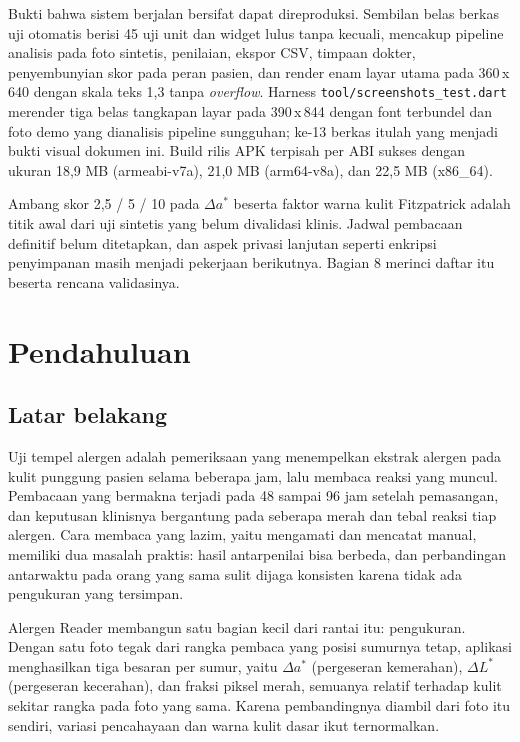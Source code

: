 \documentclass[11pt,a4paper]{article}
\begin{document}
Bukti bahwa sistem berjalan bersifat dapat direproduksi. Sembilan belas berkas
uji otomatis berisi 45 uji unit dan widget lulus tanpa kecuali, mencakup pipeline
analisis pada foto sintetis, penilaian, ekspor CSV, timpaan dokter, penyembunyian
skor pada peran pasien, dan render enam layar utama pada 360\,x\,640 dengan skala
teks 1,3 tanpa \textit{overflow}. Harness \texttt{tool/screenshots\_test.dart}
merender tiga belas tangkapan layar pada 390\,x\,844 dengan font terbundel dan
foto demo yang dianalisis pipeline sungguhan; ke-13 berkas itulah yang menjadi
bukti visual dokumen ini. Build rilis APK terpisah per ABI sukses dengan ukuran
18,9 MB (armeabi-v7a), 21,0 MB (arm64-v8a), dan 22,5 MB (x86\_64).

\begin{catatan}
Ambang skor 2,5 / 5 / 10 pada $\Delta a^*$ beserta faktor warna kulit Fitzpatrick adalah titik awal dari uji sintetis yang belum divalidasi klinis. Jadwal pembacaan definitif belum ditetapkan, dan aspek privasi lanjutan seperti enkripsi penyimpanan masih menjadi pekerjaan berikutnya. Bagian 8 merinci daftar itu beserta rencana validasinya.
\end{catatan}

\section{Pendahuluan}

\subsection{Latar belakang}

Uji tempel alergen adalah pemeriksaan yang menempelkan ekstrak alergen pada kulit
punggung pasien selama beberapa jam, lalu membaca reaksi yang muncul. Pembacaan
yang bermakna terjadi pada 48 sampai 96 jam setelah pemasangan, dan keputusan
klinisnya bergantung pada seberapa merah dan tebal reaksi tiap alergen. Cara
membaca yang lazim, yaitu mengamati dan mencatat manual, memiliki dua masalah
praktis: hasil antarpenilai bisa berbeda, dan perbandingan antarwaktu pada orang
yang sama sulit dijaga konsisten karena tidak ada pengukuran yang tersimpan.

Alergen Reader membangun satu bagian kecil dari rantai itu: pengukuran. Dengan
satu foto tegak dari rangka pembaca yang posisi sumurnya tetap, aplikasi
menghasilkan tiga besaran per sumur, yaitu $\Delta a^*$ (pergeseran kemerahan),
$\Delta L^*$ (pergeseran kecerahan), dan fraksi piksel merah, semuanya relatif
terhadap kulit sekitar rangka pada foto yang sama. Karena pembandingnya diambil
dari foto itu sendiri, variasi pencahayaan dan warna kulit dasar ikut ternormalkan.
\end{document}
